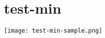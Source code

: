 \documentclass[12pt]{article}
\begin{document}
\section{test-min}
\texttt{[image: test-min-sample.png]}
\end{document}
